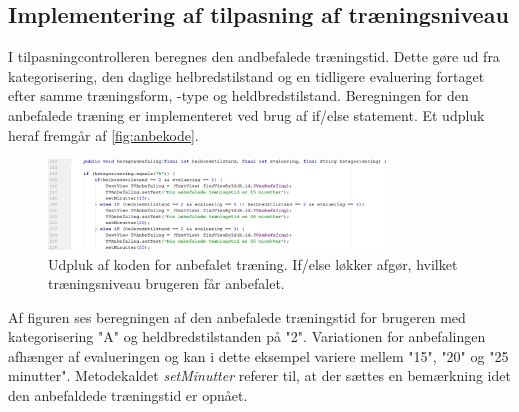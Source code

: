\subsection{Implementering af tilpasning af træningsniveau}
I tilpasningcontrolleren beregnes den andbefalede træningstid. Dette gøre ud fra kategorisering, den daglige helbredstilstand og en tidligere evaluering fortaget efter samme træningsform, -type og heldbredstilstand.
Beregningen for den anbefalede træning er implementeret ved brug af if/else statement. Et udpluk heraf fremgår af \autoref{fig:anbekode}.  
   
\begin{figure} [H]
\centering
\includegraphics[width=0.8\textwidth]{figures/imple/anbekode}
\caption{Udpluk af koden for anbefalet træning. If/else løkker afgør, hvilket træningsniveau brugeren får anbefalet.}
\label{fig:anbekode}
\end{figure} 

\noindent
Af figuren ses beregningen af den anbefalede træningstid for brugeren med kategorisering "A" og heldbredstilstanden på "2". Variationen for anbefalingen afhænger af evalueringen og kan i dette eksempel variere mellem "15", "20" og "25 minutter". Metodekaldet \textit{setMinutter} referer til, at der sættes en bemærkning idet den anbefaldede træningstid er opnået.
